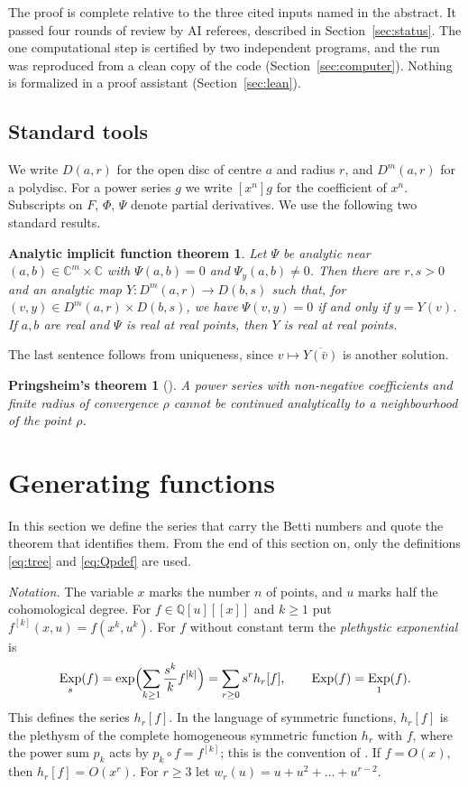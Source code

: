 \documentclass[11pt]{amsart}
\newtheorem*{ift}{Analytic implicit function theorem}
\newtheorem*{pringsheim}{Pringsheim's theorem}
\theoremstyle{definition}
\theoremstyle{remark}
\numberwithin{equation}{section}
\DeclareMathOperator{\Exp}{Exp}
\newcommand{\CC}{\mathbb{C}}
\newcommand{\QQ}{\mathbb{Q}}
\begin{document}
The proof is complete relative to the three cited inputs named in the abstract. It passed four rounds of review by AI referees, described in Section~\ref{sec:status}. The one computational step is certified by two independent programs, and the run was reproduced from a clean copy of the code (Section~\ref{sec:computer}). Nothing is formalized in a proof assistant (Section~\ref{sec:lean}).

\subsection{Standard tools}

We write \(D(a,r)\) for the open disc of centre \(a\) and radius \(r\), and \(D^m(a,r)\) for a polydisc. For a power series \(g\) we write \([x^n]g\) for the coefficient of \(x^n\). Subscripts on \(F\), \(\Phi\), \(\Psi\) denote partial derivatives. We use the following two standard results.

\begin{ift}
Let \(\Psi\) be analytic near \((a,b)\in\CC^m\times\CC\) with \(\Psi(a,b)=0\) and \(\Psi_y(a,b)\ne0\). Then there are \(r,s>0\) and an analytic map \(Y\colon D^m(a,r)\to D(b,s)\) such that, for \((v,y)\in D^m(a,r)\times D(b,s)\), we have \(\Psi(v,y)=0\) if and only if \(y=Y(v)\). If \(a,b\) are real and \(\Psi\) is real at real points, then \(Y\) is real at real points.
\end{ift}

The last sentence follows from uniqueness, since \(v\mapsto\overline{Y(\bar v)}\) is another solution.

\begin{pringsheim}[{\cite[Thm.~IV.6]{FS}}]
A power series with non-negative coefficients and finite radius of convergence \(\rho\) cannot be continued analytically to a neighbourhood of the point \(\rho\).
\end{pringsheim}

\section{Generating functions}\label{sec:gf}

In this section we define the series that carry the Betti numbers and quote the theorem that identifies them. From the end of this section on, only the definitions \eqref{eq:tree} and \eqref{eq:Qpdef} are used.

\emph{Notation.} The variable \(x\) marks the number \(n\) of points, and \(u\) marks half the cohomological degree. For \(f\in\QQ[u][[x]]\) and \(k\ge1\) put \(f^{[k]}(x,u)=f(x^k,u^k)\). For \(f\) without constant term the \emph{plethystic exponential} is
\[
\Exp_s(f)=\exp\Bigl(\sum_{k\ge1}\frac{s^k}{k}f^{[k]}\Bigr)=\sum_{r\ge0}s^r h_r[f],\qquad \Exp(f)=\Exp_1(f).
\]
This defines the series \(h_r[f]\). In the language of symmetric functions, \(h_r[f]\) is the plethysm of the complete homogeneous symmetric function \(h_r\) with \(f\), where the power sum \(p_k\) acts by \(p_k\circ f=f^{[k]}\); this is the convention of \cite[\S5.2]{CKL}. If \(f=O(x)\), then \(h_r[f]=O(x^r)\). For \(r\ge3\) let \(w_r(u)=u+u^2+\dots+u^{r-2}\).
\end{document}
